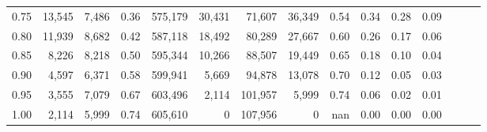 \begin{tabular}{rrrrrrrrrrrrrrr}
0.75 &  13,545 &  7,486 &  0.36 &  575,179 &   30,431 &   71,607 &   36,349 &  0.54 &  0.34 &  0.28 &      0.09 \\
0.80 &  11,939 &  8,682 &  0.42 &  587,118 &   18,492 &   80,289 &   27,667 &  0.60 &  0.26 &  0.17 &      0.06 \\
0.85 &   8,226 &  8,218 &  0.50 &  595,344 &   10,266 &   88,507 &   19,449 &  0.65 &  0.18 &  0.10 &      0.04 \\
0.90 &   4,597 &  6,371 &  0.58 &  599,941 &    5,669 &   94,878 &   13,078 &  0.70 &  0.12 &  0.05 &      0.03 \\
0.95 &   3,555 &  7,079 &  0.67 &  603,496 &    2,114 &  101,957 &    5,999 &  0.74 &  0.06 &  0.02 &      0.01 \\
1.00 &   2,114 &  5,999 &  0.74 &  605,610 &        0 &  107,956 &        0 &   nan &  0.00 &  0.00 &      0.00 \\
\bottomrule
\end{tabular}
